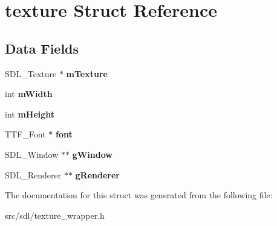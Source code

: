 \hypertarget{structtexture}{}\section{texture Struct Reference}
\label{structtexture}
\subsection*{Data Fields}
\begin{DoxyCompactItemize}
\item 
\mbox{\label{structtexture_a13441ecc6f09930e330ecc4b48189778}} 
S\+D\+L\+\_\+\+Texture $\ast$ {\bfseries m\+Texture}
\item 
\mbox{\label{structtexture_aa39f004a83a206ca8644d441c792e45b}} 
int {\bfseries m\+Width}
\item 
\mbox{\label{structtexture_a3d6a057795437ab1becbd09b09ea7a90}} 
int {\bfseries m\+Height}
\item 
\mbox{\label{structtexture_abf5bfa705e66ffc1ddaa6ce46c960873}} 
T\+T\+F\+\_\+\+Font $\ast$ {\bfseries font}
\item 
\mbox{\label{structtexture_a04da60f12d502931bdcc034cad86347f}} 
S\+D\+L\+\_\+\+Window $\ast$$\ast$ {\bfseries g\+Window}
\item 
\mbox{\label{structtexture_ad916adf6a3c707eda83ceefbdee69a26}} 
S\+D\+L\+\_\+\+Renderer $\ast$$\ast$ {\bfseries g\+Renderer}
\end{DoxyCompactItemize}


The documentation for this struct was generated from the following file\+:\begin{DoxyCompactItemize}
\item 
src/sdl/texture\+\_\+wrapper.\+h\end{DoxyCompactItemize}
